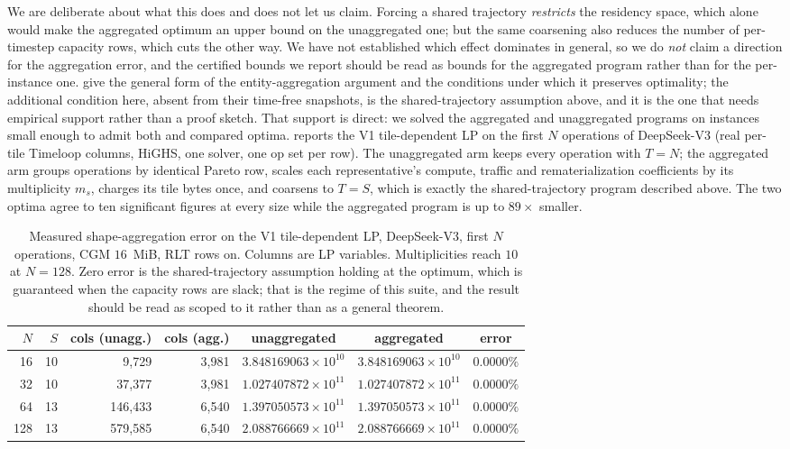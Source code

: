 We are deliberate about what this does and does not let us claim. Forcing a
shared trajectory \emph{restricts} the residency space, which alone would make
the aggregated optimum an upper bound on the unaggregated one; but the same
coarsening also reduces the number of per-timestep capacity rows, which cuts the
other way. We have not established which effect dominates in general, so we do
\emph{not} claim a direction for the aggregation error, and the certified bounds
we report should be read as bounds for the aggregated program rather than for
the per-instance one. \citet{cvxcluster2026} give the general form of the
entity-aggregation argument and the conditions under which it preserves
optimality; the additional condition here, absent from their time-free
snapshots, is the shared-trajectory assumption above, and it is the one that
needs empirical support rather than a proof sketch. That support is direct: we solved the aggregated and
unaggregated programs on instances small enough to admit both and compared
optima.  reports the V1 tile-dependent LP on the first
$N$ operations of DeepSeek-V3 (real per-tile Timeloop columns, HiGHS, one
solver, one op set per row). The unaggregated arm keeps every operation with
$T=N$; the aggregated arm groups operations by identical Pareto row, scales
each representative's compute, traffic and rematerialization coefficients by
its multiplicity $m_s$, charges its tile bytes once, and coarsens to $T=S$,
which is exactly the shared-trajectory program described above. The two optima
agree to ten significant figures at every size while the aggregated program is
up to $89\times$ smaller.

\begin{table}[ht!]
\centering
\small
\caption{Measured shape-aggregation error on the V1 tile-dependent LP,
DeepSeek-V3, first $N$ operations, CGM $16$~MiB, RLT rows on. Columns are LP
variables. Multiplicities reach $10$ at $N=128$. Zero error is the
shared-trajectory assumption holding at the optimum, which is guaranteed when
the capacity rows are slack; that is the regime of this suite, and the result
should be read as scoped to it rather than as a general theorem.}
\label{tab:agg_validation}
\begin{tabular}{@{}rrrrccc@{}}
\toprule
$N$ & $S$ & cols (unagg.) & cols (agg.) & unaggregated & aggregated & error \\
\midrule
16  & 10 & 9{,}729   & 3{,}981 & $3.848169063\times10^{10}$ & $3.848169063\times10^{10}$ & $0.0000\%$ \\
32  & 10 & 37{,}377  & 3{,}981 & $1.027407872\times10^{11}$ & $1.027407872\times10^{11}$ & $0.0000\%$ \\
64  & 13 & 146{,}433 & 6{,}540 & $1.397050573\times10^{11}$ & $1.397050573\times10^{11}$ & $0.0000\%$ \\
128 & 13 & 579{,}585 & 6{,}540 & $2.088766669\times10^{11}$ & $2.088766669\times10^{11}$ & $0.0000\%$ \\
\bottomrule
\end{tabular}
\end{table}

